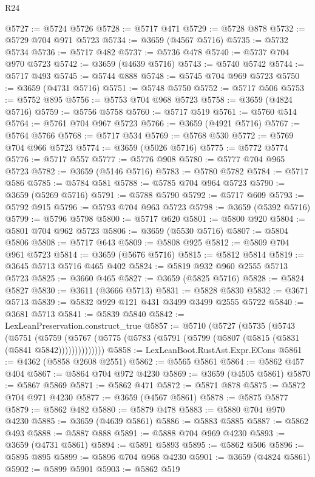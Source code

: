 \begin{lexlean}{R24}
\begin{coremodule}
@5727 := @5724 @5726
@5728 := @5717 @471
@5729 := @5728 @878
@5732 := @5729 @704 @971 @5723
@5734 := @3659 (@4567 @5716)
@5735 := @5732 @5734
@5736 := @5717 @482
@5737 := @5736 @478
@5740 := @5737 @704 @970 @5723
@5742 := @3659 (@4639 @5716)
@5743 := @5740 @5742
@5744 := @5717 @493
@5745 := @5744 @888
@5748 := @5745 @704 @969 @5723
@5750 := @3659 (@4731 @5716)
@5751 := @5748 @5750
@5752 := @5717 @506
@5753 := @5752 @895
@5756 := @5753 @704 @968 @5723
@5758 := @3659 (@4824 @5716)
@5759 := @5756 @5758
@5760 := @5717 @519
@5761 := @5760 @514
@5764 := @5761 @704 @967 @5723
@5766 := @3659 (@4921 @5716)
@5767 := @5764 @5766
@5768 := @5717 @534
@5769 := @5768 @530
@5772 := @5769 @704 @966 @5723
@5774 := @3659 (@5026 @5716)
@5775 := @5772 @5774
@5776 := @5717 @557
@5777 := @5776 @908
@5780 := @5777 @704 @965 @5723
@5782 := @3659 (@5146 @5716)
@5783 := @5780 @5782
@5784 := @5717 @586
@5785 := @5784 @581
@5788 := @5785 @704 @964 @5723
@5790 := @3659 (@5269 @5716)
@5791 := @5788 @5790
@5792 := @5717 @609
@5793 := @5792 @915
@5796 := @5793 @704 @963 @5723
@5798 := @3659 (@5392 @5716)
@5799 := @5796 @5798
@5800 := @5717 @620
@5801 := @5800 @920
@5804 := @5801 @704 @962 @5723
@5806 := @3659 (@5530 @5716)
@5807 := @5804 @5806
@5808 := @5717 @643
@5809 := @5808 @925
@5812 := @5809 @704 @961 @5723
@5814 := @3659 (@5676 @5716)
@5815 := @5812 @5814
@5819 := @3645 @5713 @5716 @465 @402
@5824 := @5819 @932 @960 @2555 @5713 @5723
@5825 := @3660 @465
@5827 := @3659 (@5825 @5716)
@5828 := @5824 @5827
@5830 := @3611 (@3666 @5713)
@5831 := @5828 @5830
@5832 := @3671 @5713
@5839 := @5832 @929 @121 @431 @3499 @3499 @2555 @5722
@5840 := @3681 @5713
@5841 := @5839 @5840
@5842 := LexLeanPreservation.construct_true
@5857 := @5710
    (@5727
      (@5735
        (@5743
          (@5751
            (@5759
              (@5767 (@5775 (@5783 (@5791 (@5799 (@5807 (@5815 (@5831 (@5841 @5842))))))))))))))
@5858 := LexLeanBoot.RustAst.Expr.ECons
@5861 := @4362 (@5858 @2608 @2551)
@5862 := @5565 @5861
@5864 := @5862 @457 @404
@5867 := @5864 @704 @972 @4230
@5869 := @3659 (@4505 @5861)
@5870 := @5867 @5869
@5871 := @5862 @471
@5872 := @5871 @878
@5875 := @5872 @704 @971 @4230
@5877 := @3659 (@4567 @5861)
@5878 := @5875 @5877
@5879 := @5862 @482
@5880 := @5879 @478
@5883 := @5880 @704 @970 @4230
@5885 := @3659 (@4639 @5861)
@5886 := @5883 @5885
@5887 := @5862 @493
@5888 := @5887 @888
@5891 := @5888 @704 @969 @4230
@5893 := @3659 (@4731 @5861)
@5894 := @5891 @5893
@5895 := @5862 @506
@5896 := @5895 @895
@5899 := @5896 @704 @968 @4230
@5901 := @3659 (@4824 @5861)
@5902 := @5899 @5901
@5903 := @5862 @519

\end{coremodule}
\end{lexlean}
